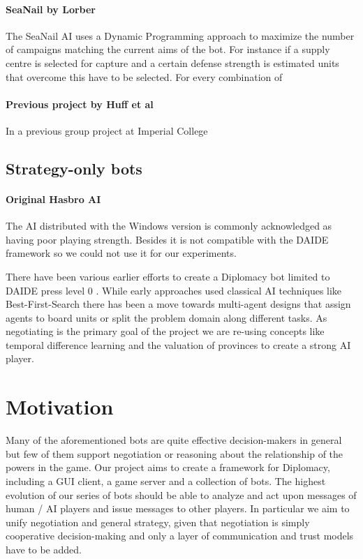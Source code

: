 \documentclass[pdftex,12pt,a4paper]{report}
\begin{document}
\paragraph{SeaNail by Lorber}

The SeaNail AI \cite{Lorber98} uses a Dynamic Programming approach to
maximize the number of campaigns matching the current aims of the
bot. For instance if a supply centre is selected for capture and a
certain defense strength is estimated units that overcome this have to
be selected. For every combination of

\paragraph{Previous project by Huff et al}

In a previous group project at Imperial College \cite{Huff05}

\subsection{Strategy-only bots}

\paragraph{Original Hasbro AI}
The AI distributed with the Windows version is commonly 
acknowledged as having poor playing strength. Besides it is not
compatible with the DAIDE framework so we could not use it for
our experiments.

There have been various earlier efforts to create a Diplomacy bot
limited to DAIDE press level 0 \cite{DAIDEsyntax10}. While early
approaches used classical AI techniques like Best-First-Search there
has been a move towards multi-agent designs that assign agents to
board units or split the problem domain along different tasks. As
negotiating is the primary goal of the project we are re-using
concepts like temporal difference learning \cite{Levinson94} and the
valuation of provinces \cite{Huff05} to create a strong AI player.


\pagebreak

\section{Motivation}

Many of the aforementioned bots are quite effective decision-makers in
general but few of them support negotiation or reasoning about the relationship of
the powers in the game. Our project aims to create a framework for
Diplomacy, including a GUI client, a game server and a collection of
bots. The highest evolution of our series of bots should be able to
analyze and act upon messages of human / AI players and issue messages
to other players. In particular we aim to unify negotiation and
general strategy, given that negotiation is simply cooperative 
decision-making and only a layer of communication and trust models have
to be added. \\
\end{document}
